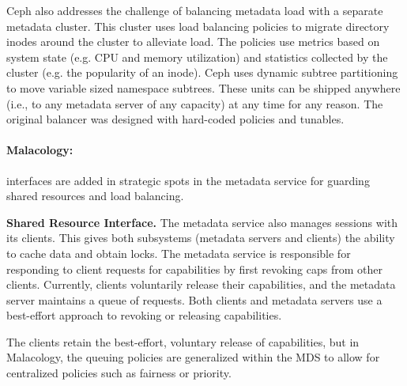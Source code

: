 \documentclass[preprint]{sigplanconf-eurosys}
\begin{document}
Ceph also addresses the challenge of balancing metadata load with a separate
metadata cluster. This cluster uses load balancing policies to migrate
directory inodes around the cluster to alleviate load. The policies use metrics
based on system state (e.g.  CPU and memory utilization) and statistics
collected by the cluster (e.g. the popularity of an inode). Ceph uses dynamic
subtree partitioning to move variable sized namespace subtrees. These units can
be shipped anywhere (i.e., to any metadata server of any capacity) at any time
for any reason. The original balancer was designed with hard-coded policies and
tunables.


\paragraph*{Malacology:} interfaces are added in strategic spots in the
metadata service for guarding shared resources and load balancing.

{\bf Shared Resource Interface.} The metadata service also manages sessions
with its clients. This gives both subsystems (metadata servers and clients) the
ability to cache data and obtain locks. The metadata service is responsible for
responding to client requests for capabilities by first revoking caps from
other clients.  Currently, clients voluntarily release their capabilities, and
the metadata server maintains a queue of requests.  Both clients and metadata
servers use a best-effort approach to revoking or releasing capabilities.

The clients retain the best-effort, voluntary release of capabilities, but in
Malacology, the queuing policies are generalized within the MDS to allow for
centralized policies such as fairness or priority.
\end{document}
